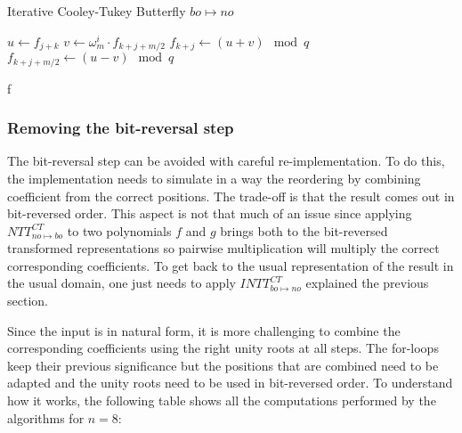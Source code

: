 \begin{algorithm}
    \caption{Iterative Cooley-Tukey Butterfly $bo \mapsto no$}
    \label{alg:IterativeCTNTT}
    \begin{algorithmic}[1]


                    \State $u \leftarrow f_{j + k}$
                    \State $v \leftarrow \omega_m^i \cdot f_{k + j + m/2}$
                    \State $f_{k + j} \leftarrow (u + v) \mod q$
                    \State $f_{k + j + m/2} \leftarrow (u - v) \mod q$
                \EndFor
            \EndFor

        \EndFor

        \Return f

    \EndProcedure

    \end{algorithmic}
\end{algorithm}

\subsubsection{Removing the bit-reversal step}

The bit-reversal step can be avoided with careful re-implementation. To do this, the implementation needs to simulate in a way the reordering by combining coefficient from the correct positions. The trade-off is that the result comes out in bit-reversed order. This aspect is not that much of an issue since applying $NTT^{CT}_{no \mapsto bo}$ to two polynomials $f$ and $g$ brings both to the bit-reversed transformed representations so pairwise multiplication will multiply the correct corresponding coefficients. To get back to the usual representation of the result in the usual domain, one just needs to apply $INTT^{CT}_{bo \mapsto no}$ explained the previous section.

Since the input is in natural form, it is more challenging to combine the corresponding coefficients using the right unity roots at all steps. The for-loops keep their previous significance but the positions that are combined need to be adapted and the unity roots need to be used in bit-reversed order. To understand how it works, the following table shows all the computations performed by the algorithms for $n=8$:

